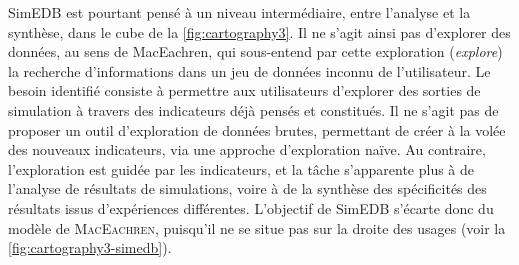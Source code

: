 SimEDB est pourtant pensé à un niveau intermédiaire, entre l'analyse et la synthèse, dans le cube de la \cref{fig:cartography3}.
Il ne s'agit ainsi pas d'explorer des données, au sens de MacEachren, qui sous-entend par cette exploration (\textit{explore}) la recherche d'informations dans un jeu de données inconnu de l'utilisateur.
Le besoin identifié consiste à permettre aux utilisateurs d'explorer des sorties de simulation à travers des indicateurs déjà pensés et constitués.
Il ne s'agit pas de proposer un outil d'exploration de données brutes, permettant de créer à la volée des nouveaux indicateurs, via une approche d'exploration \og naïve\fg{}.
Au contraire, l'exploration est guidée par les indicateurs, et la tâche s'apparente plus à de l'analyse de résultats de simulations, voire à de la synthèse des spécificités des résultats issus d'expériences différentes.
L'objectif de SimEDB s'écarte donc du \og modèle\fg{} de \textsc{MacEachren}, puisqu'il ne se situe pas sur la \og droite\fg{} des usages (voir la \cref{fig:cartography3-simedb}).

